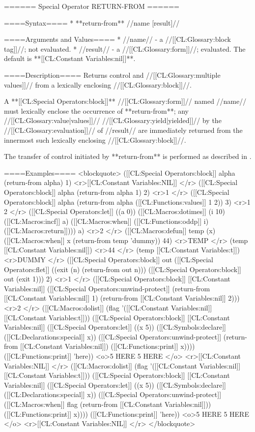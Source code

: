 ====== Special Operator RETURN-FROM ======

====Syntax====
  * **return-from** //name [result]//

====Arguments and Values====
  * //name// - a //[[CL:Glossary:block tag]]//; not evaluated.
  * //result// - a //[[CL:Glossary:form]]//; evaluated. The default is **[[CL:Constant Variables:nil]]**.

====Description====
Returns control and //[[CL:Glossary:multiple values]]// from a lexically enclosing //[[CL:Glossary:block]]//.

A **[[CL:Special Operators:block]]** //[[CL:Glossary:form]]// named //name// must lexically enclose the occurrence of **return-from**; any //[[CL:Glossary:value|values]]// //[[CL:Glossary:yield|yielded]]// by the //[[CL:Glossary:evaluation]]// of //result// are immediately returned from the innermost such lexically enclosing //[[CL:Glossary:block]]//.

The transfer of control initiated by **return-from** is performed as described in \secref\TransferOfControl.

====Examples====
<blockquote>
([[CL:Special Operators:block]] alpha 
  (return-from alpha) 
  1) <r>[[CL:Constant Variables:NIL]] </r>
([[CL:Special Operators:block]] alpha (return-from alpha 1) 2) <r>1 </r>
([[CL:Special Operators:block]] alpha (return-from alpha ([[CL:Functions:values]] 1 2)) 3) <r>1
2 </r>
([[CL:Special Operators:let]] ((a 0)) 
  ([[CL:Macros:dotimes]] (i 10) 
    ([[CL:Macros:incf]] a) 
    ([[CL:Macros:when]] ([[CL:Functions:oddp]] i) ([[CL:Macros:return]]))) 
  a) <r>2 </r>
([[CL:Macros:defun]] temp (x) 
  ([[CL:Macros:when]] x (return-from temp 'dummy)) 
  44) <r>TEMP </r>
(temp [[CL:Constant Variables:nil]]) <r>44 </r>
(temp [[CL:Constant Variables:t]]) <r>DUMMY </r>
([[CL:Special Operators:block]] out ([[CL:Special Operators:flet]] ((exit (n) (return-from out n))) ([[CL:Special Operators:block]] out (exit 1))) 2) <r>1 </r>
([[CL:Special Operators:block]] [[CL:Constant Variables:nil]] 
  ([[CL:Special Operators:unwind-protect]] 
      (return-from [[CL:Constant Variables:nil]] 1)
    (return-from [[CL:Constant Variables:nil]] 2))) <r>2 </r>
([[CL:Macros:dolist]] (flag '([[CL:Constant Variables:nil]] [[CL:Constant Variables:t]])) 
  ([[CL:Special Operators:block]] [[CL:Constant Variables:nil]] 
    ([[CL:Special Operators:let]] ((x 5)) 
      ([[CL:Symbols:declare]] ([[CL:Declarations:special]] x)) 
      ([[CL:Special Operators:unwind-protect]] 
          (return-from [[CL:Constant Variables:nil]])
        ([[CL:Functions:print]] x))))
  ([[CL:Functions:print]] 'here))
<o>5
HERE
5
HERE </o>
<r>[[CL:Constant Variables:NIL]] </r>
([[CL:Macros:dolist]] (flag '([[CL:Constant Variables:nil]] [[CL:Constant Variables:t]])) 
  ([[CL:Special Operators:block]] [[CL:Constant Variables:nil]] 
    ([[CL:Special Operators:let]] ((x 5)) 
      ([[CL:Symbols:declare]] ([[CL:Declarations:special]] x))
    ([[CL:Special Operators:unwind-protect]] 
        ([[CL:Macros:when]] flag (return-from [[CL:Constant Variables:nil]]))
      ([[CL:Functions:print]] x)))) 
  ([[CL:Functions:print]] 'here))
<o>5
HERE
5
HERE </o>
<r>[[CL:Constant Variables:NIL]] </r>
</blockquote>

